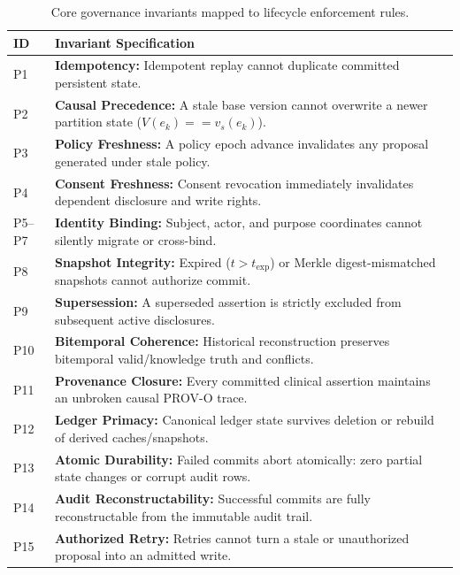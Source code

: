 \documentclass[runningheads]{llncs}
\begin{document}
\begin{table}[t]
\caption{Core governance invariants mapped to lifecycle enforcement rules.}
\label{tab:inv}
\centering\scriptsize
\begin{tabularx}{\textwidth}{p{}X}
\toprule
ID & Invariant Specification \\
\midrule
P1 & \textbf{Idempotency:} Idempotent replay cannot duplicate committed persistent state.\\
P2 & \textbf{Causal Precedence:} A stale base version cannot overwrite a newer partition state ($V(e_k) == v_s(e_k)$).\\
P3 & \textbf{Policy Freshness:} A policy epoch advance invalidates any proposal generated under stale policy.\\
P4 & \textbf{Consent Freshness:} Consent revocation immediately invalidates dependent disclosure and write rights.\\
P5--P7 & \textbf{Identity Binding:} Subject, actor, and purpose coordinates cannot silently migrate or cross-bind.\\
P8 & \textbf{Snapshot Integrity:} Expired ($t > t_{\text{exp}}$) or Merkle digest-mismatched snapshots cannot authorize commit.\\
P9 & \textbf{Supersession:} A superseded assertion is strictly excluded from subsequent active disclosures.\\
P10 & \textbf{Bitemporal Coherence:} Historical reconstruction preserves bitemporal valid/knowledge truth and conflicts.\\
P11 & \textbf{Provenance Closure:} Every committed clinical assertion maintains an unbroken causal PROV-O trace.\\
P12 & \textbf{Ledger Primacy:} Canonical ledger state survives deletion or rebuild of derived caches/snapshots.\\
P13 & \textbf{Atomic Durability:} Failed commits abort atomically: zero partial state changes or corrupt audit rows.\\
P14 & \textbf{Audit Reconstructability:} Successful commits are fully reconstructable from the immutable audit trail.\\
P15 & \textbf{Authorized Retry:} Retries cannot turn a stale or unauthorized proposal into an admitted write.\\
\bottomrule
\end{tabularx}
\end{table}
\end{document}
